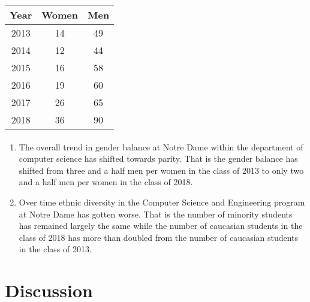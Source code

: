 \documentclass[letterpaper]{article}
\begin{document}
\begin{center}
\begin{tabular}{ |c|c|c| }
 \hline
 Year & Women & Men \\
 \hline
 2013 & 14 & 49 \\
 \hline
 2014 & 12 & 44 \\
 \hline
 2015 & 16 & 58 \\
 \hline
 2016 & 19 & 60 \\
 \hline
 2017 & 26 & 65 \\
 \hline
 2018 & 36 & 90 \\
 \hline
\end{tabular}
\end{center}

\paragraph{}

\begin{enumerate}

\item{}The overall trend in gender balance at Notre Dame within the 
department of computer science has shifted towards parity. That is the 
gender balance has shifted from three and a half men per women in the 
class of 2013 to only two and a half men per women in the class of 2018.

\item{}Over time ethnic diversity in the Computer Science and 
Engineering program at Notre Dame has gotten worse. That is the 
number of minority students has remained largely the same while the 
number of caucasian students in the class of 2018 has more than 
doubled from the number of caucasian students in the class of 2013.

\end{enumerate}

\paragraph{}


\section*{Discussion}

\paragraph{}
\end{document}
